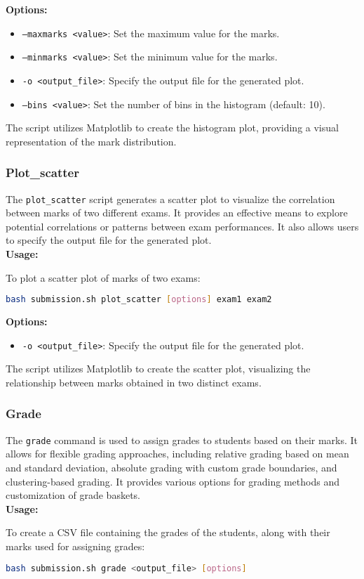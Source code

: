 \documentclass{article}
\begin{document}
\textbf{Options:}
\begin{itemize}
    \item \texttt{--maxmarks <value>}: Set the maximum value for the marks.
    \item \texttt{--minmarks <value>}: Set the minimum value for the marks.
    \item \texttt{-o <output\_file>}: Specify the output file for the generated plot.
    \item \texttt{--bins <value>}: Set the number of bins in the histogram (default: 10).
\end{itemize}

The script utilizes Matplotlib to create the histogram plot, providing a visual representation of the mark distribution. 

\subsubsection{Plot\_scatter}
The \texttt{plot\_scatter} script generates a scatter plot to visualize the correlation between marks of two different exams. It provides an effective means to explore potential correlations or patterns between exam performances. It also allows users to specify the output file for the generated plot.\\
\textbf{Usage:}
\begin{adjustwidth}{0.5cm}{0cm}
To plot a scatter plot of marks of two exams:
\begin{lstlisting}[language=bash]
bash submission.sh plot_scatter [options] exam1 exam2
\end{lstlisting}
\end{adjustwidth}

\textbf{Options:}
\begin{itemize}
    \item \texttt{-o <output\_file>}: Specify the output file for the generated plot.
\end{itemize}

The script utilizes Matplotlib to create the scatter plot, visualizing the relationship between marks obtained in two distinct exams. 

\subsubsection{Grade}
The \texttt{grade} command is used to assign grades to students based on their marks. It allows for flexible grading approaches, including relative grading based on mean and standard deviation, absolute grading with custom grade boundaries, and clustering-based grading. It provides various options for grading methods and customization of grade baskets.\\
\textbf{Usage:}
\begin{adjustwidth}{0.5cm}{0cm}
To create a CSV file containing the grades of the students, along with their marks used for assigning grades:
\begin{lstlisting}[language=bash]
bash submission.sh grade <output_file> [options]
\end{lstlisting}
\end{adjustwidth}
\end{document}
